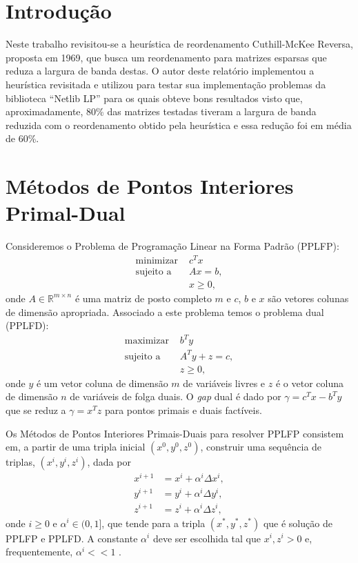 % 
% 
% 

\section{Introdução}
Neste trabalho revisitou-se a heurística de reordenamento Cuthill-McKee
Reversa, proposta em 1969, que busca um reordenamento para matrizes esparsas
que reduza a largura de banda destas. O autor deste relatório implementou a heurística
revisitada e utilizou para testar sua implementação problemas da biblioteca
``Netlib LP'' para os quais obteve bons resultados visto que, aproximadamente,
80\% das matrizes testadas tiveram a largura de banda reduzida com o
reordenamento obtido pela heurística e essa redução foi em média de 60\%.

\section{Métodos de Pontos Interiores Primal-Dual}
Consideremos o Problema de Programação Linear na Forma Padrão (PPLFP):
\begin{align*}
    \text{minimizar } & c^T x \\
    \text{sujeito a } & A x = b, \\
    & x \geq 0,
\end{align*}
onde $A \in \mathbb{R}^{m \times n}$ é uma matriz de posto completo $m$ e $c$,
$b$ e $x$ são vetores colunas de dimensão apropriada. Associado a este problema
temos o problema dual (PPLFD):
\begin{align*}
    \text{maximizar } & b^T y \\
    \text{sujeito a } & A^T y + z = c, \\
    & z \geq 0,
\end{align*}
onde $y$ é um vetor coluna de dimensão $m$ de variáveis livres e $z$ é o vetor
coluna de dimensão $n$ de variáveis de folga duais. O \textit{gap} dual é dado
por $\gamma = c^T x - b^T y$ que se reduz a $\gamma = x^T z$ para pontos primais
e duais factíveis.

Os Métodos de Pontos Interiores Primais-Duais para resolver PPLFP consistem em, a
partir de uma tripla inicial $(x^0, y^0, z^0)$, construir uma
sequência de triplas, $(x^i, y^i, z^i)$, dada por
\begin{align*}
    x^{i + 1} &= x^i + \alpha^i \Delta x^i, \\
    y^{i + 1} &= y^i + \alpha^i \Delta y^i, \\
    z^{i + 1} &= z^i + \alpha^i \Delta z^i,
\end{align*}
onde $i \geq 0$ e $\alpha^i \in (0, 1]$, que tende para a tripla $(x^*, y^*, z^*)$ que é
solução de PPLFP e PPLFD. A constante $\alpha^i$ deve ser escolhida tal que $x^i,
z^i > 0$ e, frequentemente, $\alpha^i << 1$ \cite{Wright:1987:PrimalDualIP}.

